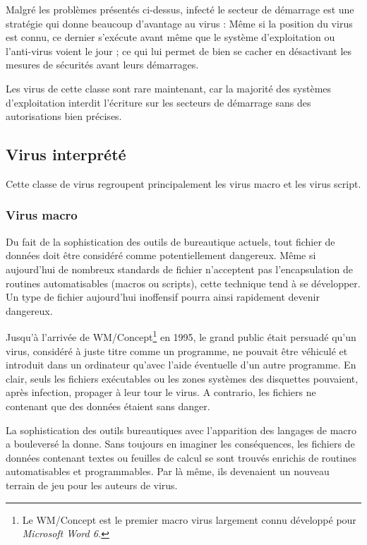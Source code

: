     Malgré les problèmes présentés ci-dessus, infecté le secteur de démarrage est une stratégie qui donne beaucoup
    d'avantage au virus : Même si la position du virus est connu, ce dernier s'exécute avant même que le système 
    d'exploitation ou l'anti-virus voient le jour ; ce qui lui permet de bien se cacher en désactivant les mesures 
    de sécurités avant leurs démarrages.

    Les virus de cette classe sont rare maintenant, car la majorité des systèmes d'exploitation interdit l'écriture
    sur les secteurs de démarrage sans des autorisations bien précises.

    \subsection{Virus interprété}
    Cette classe de virus regroupent principalement les virus macro et les virus script.
        \subsubsection{Virus macro}
        Du fait de la sophistication des outils de bureautique actuels, tout fichier de données doit être 
        considéré comme potentiellement dangereux. Même si aujourd’hui de nombreux standards de fichier 
        n’acceptent pas l’encapsulation de routines automatisables (macros ou scripts), 
        cette technique tend à se développer. Un type de fichier aujourd’hui inoffensif pourra ainsi 
        rapidement devenir dangereux.

        Jusqu’à l’arrivée de WM/Concept\footnote{Le WM/Concept est le premier macro virus largement connu
        développé pour \emph{Microsoft Word 6.}} en 1995, le grand public était persuadé qu’un virus, 
        considéré à juste titre comme un programme, ne pouvait être véhiculé et introduit dans un ordinateur 
        qu’avec l'aide éventuelle d’un autre programme. En clair, seuls les fichiers exécutables ou les zones 
        systèmes des disquettes pouvaient, après infection, propager à leur tour le virus. 
        A contrario, les fichiers ne contenant que des données étaient sans danger.

        La sophistication des outils bureautiques avec l’apparition des langages de macro a bouleversé 
        la donne. Sans toujours en imaginer les conséquences, les fichiers de données contenant textes ou feuilles 
        de calcul se sont trouvés enrichis de routines automatisables et programmables. 
        Par là même, ils devenaient un nouveau terrain de jeu pour les auteurs de virus.

